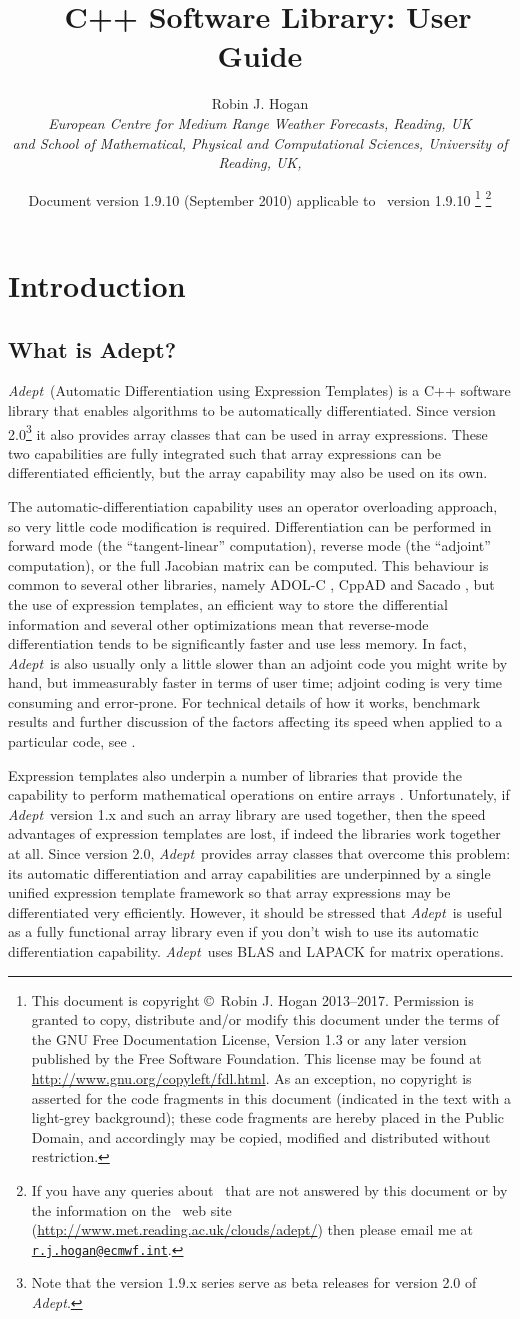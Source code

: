 \documentclass[a4,oneside]{book}
\title{\Adept\ C++ Software Library: User Guide}
\author{Robin J. Hogan\\ \emph{European Centre for Medium Range
    Weather Forecasts, Reading, UK}\\ \emph{and School of
    Mathematical, Physical and Computational Sciences, University of
    Reading, UK,}}
\date{Document version 1.9.10 (September 2010) applicable to \Adept\ version
  1.9.10 \thanks{This document is copyright \copyright\ Robin J. Hogan
    2013--2017.  Permission is granted to copy, distribute and/or
    modify this document under the terms of the GNU Free Documentation
    License, Version 1.3 or any later version published by the Free
    Software Foundation. This license may be found at
    \url{http://www.gnu.org/copyleft/fdl.html}.  As an exception, no
    copyright is asserted for the code fragments in this document
    (indicated in the text with a light-grey background); these code
    fragments are hereby placed in the Public Domain, and accordingly
    may be copied, modified and distributed without restriction.}
  \thanks{If you have any queries about \Adept\ that are not answered
    by this document or by the information on the \Adept\ web site
    (\url{http://www.met.reading.ac.uk/clouds/adept/}) then please
    email me at
    \href{mailto:r.j.hogan@ecmwf.int}{\texttt{r.j.hogan@ecmwf.int}}.}}
\def\Adept{\emph{Adept}}
\renewcommand\thefootnote{\relax}
\begin{document}
\maketitle

\tableofcontents
\def\thefootnote{\fnsymbol{footnote}}
\chapter{Introduction}
\section{What is Adept?}
\Adept\ (Automatic Differentiation using Expression Templates) is a
C++ software library that enables algorithms to be automatically
differentiated. Since version 2.0\footnote{Note that the version 1.9.x
  series serve as beta releases for version 2.0 of \Adept.} it also
provides array classes that can be used in array expressions.  These
two capabilities are fully integrated such that array expressions can
be differentiated efficiently, but the array capability may also be
used on its own.

The automatic-differentiation capability uses an operator overloading
approach, so very little code modification is
required. Differentiation can be performed in forward mode (the
``tangent-linear'' computation), reverse mode (the ``adjoint''
computation), or the full Jacobian matrix can be computed. This
behaviour is common to several other libraries, namely ADOL-C
\citep{Griewank+1996}, CppAD \citep{Bell2007} and Sacado
\citep{Gay2005}, but the use of expression templates, an efficient way
to store the differential information and several other optimizations
mean that reverse-mode differentiation tends to be significantly
faster and use less memory. In fact, \Adept\ is also usually only a
little slower than an adjoint code you might write by hand, but
immeasurably faster in terms of user time; adjoint coding is very time
consuming and error-prone. For technical details of how it works,
benchmark results and further discussion of the factors affecting its
speed when applied to a particular code, see \cite{Hogan2014}.

Expression templates also underpin a number of libraries that provide
the capability to perform mathematical operations on entire arrays
\citep{Veldhuizen1995}. Unfortunately, if \Adept\ version 1.x and such
an array library are used together, then the speed advantages of
expression templates are lost, if indeed the libraries work together
at all. Since version 2.0, \Adept\ provides array classes that
overcome this problem: its automatic differentiation and array
capabilities are underpinned by a single unified expression template
framework so that array expressions may be differentiated very
efficiently.  However, it should be stressed that \Adept\ is useful as
a fully functional array library even if you don't wish to use its
automatic differentiation capability. \Adept\ uses BLAS and LAPACK for
matrix operations.
\end{document}
